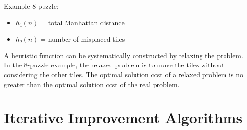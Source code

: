 \documentclass[12pt]{article}
\begin{document}
\begin{enumerate}[label=\textbf{IS.\arabic*}]
          Example 8-puzzle:
          \begin{itemize}
              \item $h_1(n)$ = total Manhattan distance
              \item $h_2(n)$ = number of misplaced tiles
          \end{itemize}

          A heuristic function can be systematically constructed by relaxing the problem. In the 8-puzzle example, the relaxed problem is to move the tiles without considering the other tiles. The optimal solution cost of a relaxed problem is no greater than the optimal solution cost of the real problem.

\end{enumerate}
\section{Iterative Improvement Algorithms}\label{iterativeimprovement}
\end{document}
